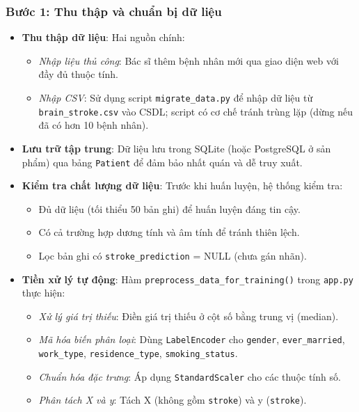 ﻿\documentclass{article}
\begin{document}
\subsubsection{Bước 1: Thu thập và chuẩn bị dữ liệu}
\begin{itemize}
    \item \textbf{Thu thập dữ liệu}: Hai nguồn chính:
    \begin{itemize}
        \item \textit{Nhập liệu thủ công}: Bác sĩ thêm bệnh nhân mới qua giao diện web với đầy đủ thuộc tính.
        \item \textit{Nhập CSV}: Sử dụng script \texttt{migrate\_data.py} để nhập dữ liệu từ \texttt{brain\_stroke.csv} vào CSDL; script có cơ chế tránh trùng lặp (dừng nếu đã có hơn 10 bệnh nhân).
    \end{itemize}
    
    \item \textbf{Lưu trữ tập trung}: Dữ liệu lưu trong SQLite (hoặc PostgreSQL ở sản phẩm) qua bảng \texttt{Patient} để đảm bảo nhất quán và dễ truy xuất.
    
    \item \textbf{Kiểm tra chất lượng dữ liệu}: Trước khi huấn luyện, hệ thống kiểm tra:
    \begin{itemize}
        \item Đủ dữ liệu (tối thiểu 50 bản ghi) để huấn luyện đáng tin cậy.
        \item Có cả trường hợp dương tính và âm tính để tránh thiên lệch.
        \item Lọc bản ghi có \texttt{stroke\_prediction} = NULL (chưa gán nhãn).
    \end{itemize}
    
    \item \textbf{Tiền xử lý tự động}: Hàm \texttt{preprocess\_data\_for\_training()} trong \texttt{app.py} thực hiện:
    \begin{itemize}
        \item \textit{Xử lý giá trị thiếu}: Điền giá trị thiếu ở cột số bằng trung vị (median).
        \item \textit{Mã hóa biến phân loại}: Dùng \texttt{LabelEncoder} cho \texttt{gender}, \texttt{ever\_married}, \texttt{work\_type}, \texttt{residence\_type}, \texttt{smoking\_status}.
        \item \textit{Chuẩn hóa đặc trưng}: Áp dụng \texttt{StandardScaler} cho các thuộc tính số.
        \item \textit{Phân tách X và y}: Tách X (không gồm \texttt{stroke}) và y (\texttt{stroke}).
    \end{itemize}
\end{itemize}
\end{document}
